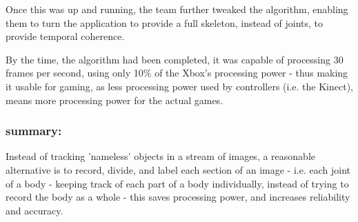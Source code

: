 Once this was up and running, the team further tweaked the algorithm, enabling them to turn the application to provide a full skeleton, instead of joints, to provide temporal coherence.

By the time, the algorithm had been completed, it was capable of processing 30 frames per second, using only 10\% of the Xbox's processing power - thus making it usable for gaming, as less processing power used by controllers (i.e. the Kinect), means more processing power for the actual games.

\subsubsection*{summary:}
Instead of tracking 'nameless' objects in a stream of images, a reasonable alternative is to record, divide, and label each section of an image - i.e. each joint of a body - keeping track of each part of a body individually, instead of trying to record the body as a whole - this saves processing power, and increases reliability and accuracy.